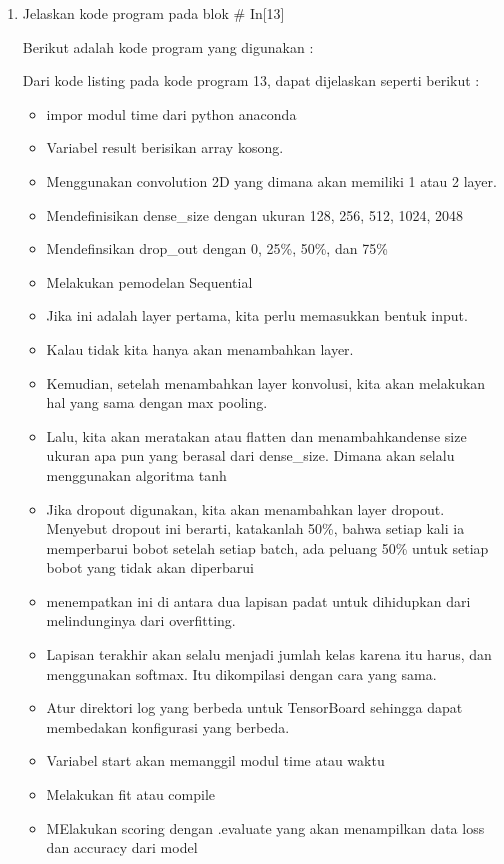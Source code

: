 \begin{enumerate}
\item Jelaskan kode program pada blok \# In[13]
\par Berikut adalah kode program yang digunakan :

\par Dari kode listing pada kode program 13, dapat dijelaskan seperti berikut :
\begin{itemize}
\item impor modul time dari python anaconda
\item Variabel result berisikan array kosong.
\item Menggunakan convolution 2D yang dimana akan memiliki 1 atau 2 layer.
\item Mendefinisikan dense\_size dengan ukuran 128, 256, 512, 1024, 2048
\item Mendefinsikan drop\_out dengan 0, 25\%, 50\%, dan 75\%
\item Melakukan pemodelan Sequential
\item Jika ini adalah layer pertama, kita perlu memasukkan bentuk input.
\item Kalau tidak kita hanya akan menambahkan layer.
\item Kemudian, setelah menambahkan layer konvolusi, kita akan melakukan hal yang sama dengan max pooling.
\item  Lalu, kita akan meratakan atau flatten dan menambahkandense size ukuran apa pun yang berasal dari dense\_size. Dimana akan selalu menggunakan algoritma tanh
\item Jika dropout digunakan, kita akan menambahkan layer dropout. Menyebut dropout ini berarti, katakanlah 50\%, bahwa setiap kali ia memperbarui bobot setelah setiap batch, ada peluang 50\% untuk setiap bobot yang tidak akan diperbarui
\item menempatkan ini di antara dua lapisan padat untuk dihidupkan dari melindunginya dari overfitting.
\item  Lapisan terakhir akan selalu menjadi jumlah kelas karena itu harus, dan menggunakan softmax. Itu dikompilasi dengan cara yang sama.
\item Atur direktori log yang berbeda untuk TensorBoard sehingga dapat membedakan konfigurasi yang berbeda.
\item Variabel start akan memanggil modul time atau waktu
\item Melakukan fit atau compile 
\item MElakukan scoring dengan .evaluate yang akan menampilkan data loss dan accuracy dari model

\end{itemize}
\end{enumerate}

